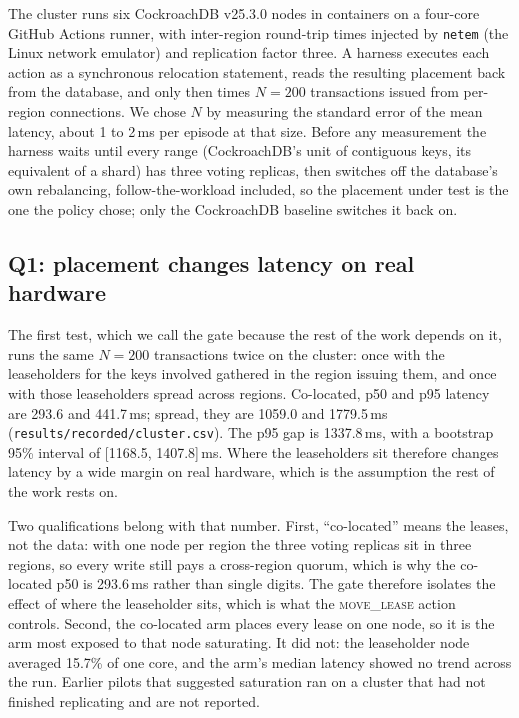 The cluster runs six CockroachDB v25.3.0 nodes in containers on a four-core
GitHub Actions runner, with inter-region round-trip times injected by
\texttt{netem} (the Linux network emulator) and replication factor three. A
harness executes each action as a synchronous relocation statement, reads the
resulting placement back from the database, and only then times $N=200$
transactions issued from per-region connections. We chose $N$ by measuring the
standard error of the mean latency, about 1 to 2\,ms per episode at that size.
Before any measurement the harness waits until every range (CockroachDB's unit
of contiguous keys, its equivalent of a shard) has three voting replicas, then
switches off the database's own rebalancing, follow-the-workload included, so
the placement under test is the one the policy chose; only the CockroachDB
baseline switches it back on.

\subsection{Q1: placement changes latency on real hardware}

The first test, which we call the gate because the rest of the work depends
on it, runs the same $N=200$ transactions twice on the cluster: once with the
leaseholders for the keys involved gathered in the region issuing them, and
once with those leaseholders spread across regions. Co-located, p50 and p95
latency are 293.6 and 441.7\,ms; spread, they are 1059.0 and 1779.5\,ms
(\texttt{results/recorded/cluster.csv}). The p95 gap is 1337.8\,ms, with a
bootstrap 95\% interval of [1168.5, 1407.8]\,ms. Where the leaseholders sit
therefore changes latency by a wide margin on real hardware, which is the
assumption the rest of the work rests on.

Two qualifications belong with that number. First, ``co-located'' means the
leases, not the data: with one node per region the three voting replicas sit in
three regions, so every write still pays a cross-region quorum, which is why the
co-located p50 is 293.6\,ms rather than single digits. The gate therefore
isolates the effect of where the leaseholder sits, which is what the
\textsc{move\_lease} action controls. Second, the co-located arm places every
lease on one node, so it is the arm most exposed to that node saturating. It
did not: the leaseholder node averaged 15.7\% of one core, and the arm's median
latency showed no trend across the run. Earlier pilots that suggested
saturation ran on a cluster that had not finished replicating and are not
reported.

